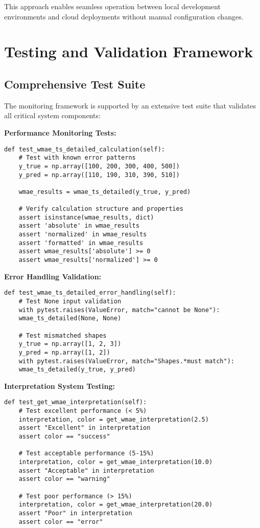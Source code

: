 This approach enables seamless operation between local development environments and cloud deployments without manual configuration changes.

\section{Testing and Validation Framework}

\subsection{Comprehensive Test Suite}

The monitoring framework is supported by an extensive test suite that validates all critical system components:

\textbf{Performance Monitoring Tests:}
\begin{lstlisting}[language=MyPython, caption={WMAE Performance Monitoring Test}]
	def test_wmae_ts_detailed_calculation(self):
	# Test with known error patterns
	y_true = np.array([100, 200, 300, 400, 500])
	y_pred = np.array([110, 190, 310, 390, 510])
	
	wmae_results = wmae_ts_detailed(y_true, y_pred)
	
	# Verify calculation structure and properties
	assert isinstance(wmae_results, dict)
	assert 'absolute' in wmae_results
	assert 'normalized' in wmae_results
	assert 'formatted' in wmae_results
	assert wmae_results['absolute'] >= 0
	assert wmae_results['normalized'] >= 0
\end{lstlisting}

\textbf{Error Handling Validation:}
\begin{lstlisting}[language=MyPython, caption={Error Handling Validation Tests}]
	def test_wmae_ts_detailed_error_handling(self):
	# Test None input validation
	with pytest.raises(ValueError, match="cannot be None"):
	wmae_ts_detailed(None, None)
	
	# Test mismatched shapes
	y_true = np.array([1, 2, 3])
	y_pred = np.array([1, 2])
	with pytest.raises(ValueError, match="Shapes.*must match"):
	wmae_ts_detailed(y_true, y_pred)
\end{lstlisting}

\textbf{Interpretation System Testing:}
\begin{lstlisting}[language=MyPython, caption={Performance Interpretation Testing}]
	def test_get_wmae_interpretation(self):
	# Test excellent performance (< 5%)
	interpretation, color = get_wmae_interpretation(2.5)
	assert "Excellent" in interpretation
	assert color == "success"
	
	# Test acceptable performance (5-15%)
	interpretation, color = get_wmae_interpretation(10.0)
	assert "Acceptable" in interpretation
	assert color == "warning"
	
	# Test poor performance (> 15%)
	interpretation, color = get_wmae_interpretation(20.0)
	assert "Poor" in interpretation
	assert color == "error"
\end{lstlisting}

